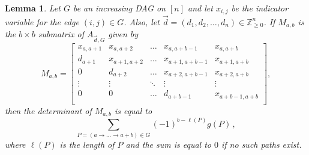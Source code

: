 \documentclass[12pt]{amsart}
\newtheorem{lemma}[thm]{Lemma}
\theoremstyle{definition}
\numberwithin{equation}{section}
\newcommand{\ring}[1]{\ensuremath{\mathbb{#1}}}
\renewcommand\>{\rangle}
\newcommand\<{\langle}
\newcommand\0{\mathbf{0}}
\newcommand\ZZ{\ring{Z}}
\begin{document}
\begin{lemma}\label{thm:minor_det}
	Let $G$ be an increasing DAG on $[n]$ and let $x_{i,j}$ be the indicator variable for the edge $(i,j) \in G$. Also, let $\vec{d} = (d_1, d_2, \dots, d_n) \in \ZZ_{\geq 0}^n$.
	If $M_{a,b}$ is the $b \times b$ submatrix of $A_{\vec{d}, G}$ given by
	\[
	M_{a,b} = \begin{bmatrix}
		x_{a,a+1} & x_{a,a+2} & \dots & x_{a,a+b-1} & x_{a,a+b} \\
		d_{a+1} & x_{a+1, a+2} & \dots & x_{a+1,a+b-1} & x_{a+1,a+b} \\
		0 & d_{a+2} & \dots & x_{a+2,a+b-1} & x_{a+2,a+b} \\
		\vdots & \vdots & \ddots & \vdots & \vdots \\
		0 & 0 & \dots & d_{a+b-1} & x_{a+b-1,a+b} \\
	\end{bmatrix},
	\]
	then the determinant of $M_{a,b}$ is equal to
	\[
	\sum_{P = (a \to \dots \to a+b) \in G}   (-1)^{b-\ell(P)} g(P)  \, ,
	\]
	where $\ell(P)$ is the length of $P$ and the sum is equal to $0$ if no such paths exist.
\end{lemma}
\end{document}
